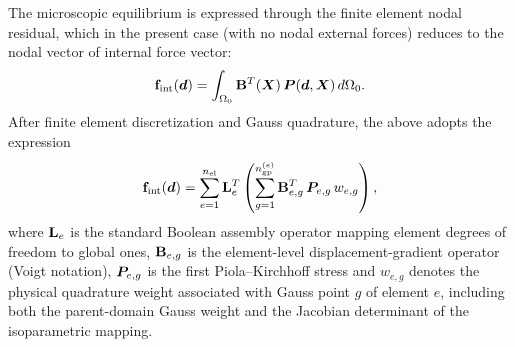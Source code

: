 \documentclass[11pt,a4paper]{article}
\begin{document}
The microscopic equilibrium is expressed through the finite element nodal residual, which in the present case (with no nodal external forces) reduces to  the nodal vector of internal force vector:
\begin{equation}
 \mathbf{f}_{\mathrm{int}}(\bm{d})=\int_{\Omega_0}\mathbf{B}^T(\bm{X})\,\boldsymbol{P}(\bm{d},\bm{X})\,d\Omega_0.
\end{equation}
\noindent  After finite element discretization and Gauss quadrature, the above  adopts the expression
\begin{equation}
\label{eq:33333}
    \mathbf{f}_{\mathrm{int}}(\bm{d})
    =
    \sum_{e=1}^{n_{\mathrm{el}}}
   \mathbf{L}_e^T
    \left(
    \sum_{g=1}^{n_{\mathrm{gp}}^{(e)}}
    \mathbf{B}_{e,g}^T \, \boldsymbol{P}_{e,g} \, w_{e,g}
    \right),
\end{equation}
where $\mathbf{L}_e$ is the standard Boolean assembly operator mapping
element degrees of freedom to global ones, $\mathbf{B}_{e,g}$ is the element-level
displacement-gradient operator (Voigt notation),   $\boldsymbol{P}_{e,g}$ is the
first Piola--Kirchhoff stress and $w_{e,g}$ denotes the physical quadrature weight associated with Gauss
point $g$ of element $e$, including both the parent-domain Gauss weight and the
Jacobian determinant of the isoparametric mapping.
\end{document}
